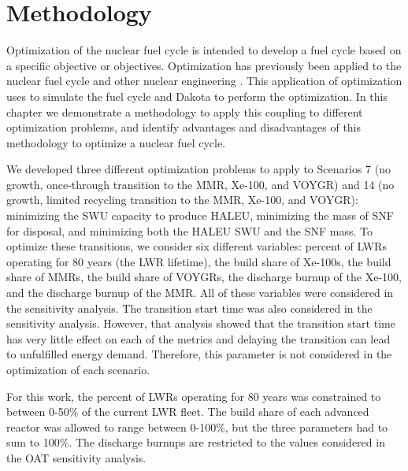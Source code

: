 \section{Methodology}
Optimization of the nuclear fuel cycle is intended to develop 
a fuel cycle based on a specific objective or objectives. 
Optimization has previously been applied to the nuclear fuel 
cycle \cite{passerini_sensitivity_2012,andrianov_optimization_2019}
and other nuclear engineering \cite{chee_fluoride-salt-cooled_2022}.
This application of optimization uses \Cyclus \cite{huff_fundamental_2016}
to simulate the fuel cycle and Dakota \cite{adams_dakota_2021} to 
perform the optimization. In this chapter we demonstrate a methodology to 
apply this coupling to different optimization problems, and identify 
advantages and disadvantages of this methodology to optimize a nuclear 
fuel cycle. 

We developed three different optimization problems to apply to 
Scenarios 7 (no growth, once-through transition to the \gls{MMR}, Xe-100, 
and VOYGR) and 14 (no growth, limited recycling transition to the 
\gls{MMR}, Xe-100, and VOYGR): minimizing the \gls{SWU} capacity to 
produce \gls{HALEU}, minimizing the mass of \gls{SNF} for disposal, 
and minimizing both the \gls{HALEU} \gls{SWU} and the \gls{SNF} 
mass. To optimize these transitions, we consider six different 
variables: percent of \glspl{LWR} operating for 80 years (the \gls{LWR} 
lifetime), the build share 
of Xe-100s, the build share of \glspl{MMR}, the build share of VOYGRs, 
the discharge burnup of the Xe-100, and the discharge burnup of the 
\gls{MMR}. All of these variables were considered in the sensitivity 
analysis. The transition start time was also considered in the sensitivity 
analysis. However, that analysis showed that the transition start time has
very little effect on each of the metrics and delaying the transition 
can lead to unfulfilled energy demand. Therefore, this parameter is 
not considered in the optimization of each scenario. 

For this work, the percent of \glspl{LWR} operating for 80 years 
was constrained to between 0-50\% of the current \gls{LWR} fleet. 
The build share of each advanced reactor was allowed to range between 
0-100\%, but the three parameters had to sum to 100\%. The discharge 
burnups are restricted to the values considered in the \gls{OAT} 
sensitivity analysis.

